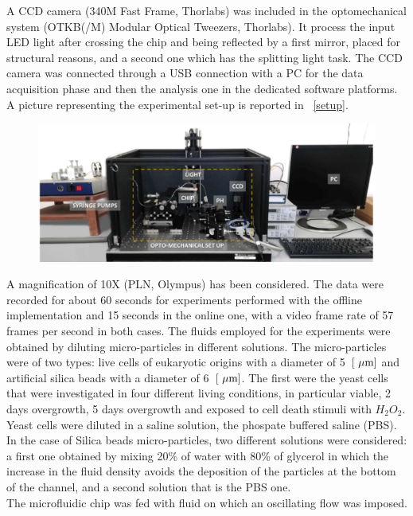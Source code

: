\documentclass[journal]{IEEEtran}
\theoremstyle{definition}
\theoremstyle{remark}
\begin{document}
A CCD camera (340M Fast Frame, Thorlabs) was included in the optomechanical system (OTKB(/M) Modular Optical Tweezers, Thorlabs). It process the input LED light after crossing the chip and being reflected by a first mirror, placed for structural reasons, and a second one which has the splitting light task. The CCD camera was connected through a USB connection with a PC for the data acquisition phase and then the analysis one in the dedicated software platforms. A picture representing the experimental set-up is reported in ~\fig\ref{setup}. 

\begin{figure}[h]
	\centering
	\includegraphics[width=1\columnwidth]{images/setup}
\end{figure}
A magnification of 10X (PLN, Olympus) has been considered.
The data were recorded for about 60 seconds for experiments performed with the offline implementation and 15 seconds in the online one, with a video frame rate of 57 frames per second in both cases.
The fluids employed for the experiments were obtained by diluting micro-particles in different solutions. The micro-particles were of two types: live cells of eukaryotic origins with a diameter of 5~$[\rm~\mu m]$ and artificial silica beads with a diameter of 6~$[\rm~\mu m]$. The first were the yeast cells that were investigated in four different living conditions, in particular viable, 2 days overgrowth, 5 days overgrowth and exposed to cell death stimuli with $H_2O_2$. 
Yeast cells were diluted in a saline solution, the phospate buffered saline (PBS). In the case of Silica beads micro-particles, two different solutions were considered: a first one obtained by mixing 20\% of water with 80\% of glycerol in which the increase in the fluid density avoids the deposition of the particles at the bottom of the channel, and a second solution that is the PBS one.
\\The microfluidic chip was fed with fluid on which an oscillating flow was imposed.
\end{document}
